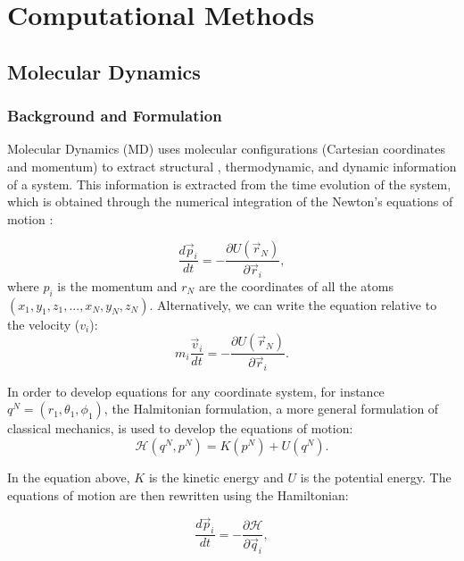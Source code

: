 
\chapter{Computational Methods} %

\label{Chapter3} %

\section{Molecular Dynamics}

\subsection{Background and Formulation}
Molecular Dynamics (MD) uses molecular configurations (Cartesian coordinates and momentum) to extract structural , thermodynamic, and dynamic information of a system. This information is extracted from the time evolution of the system, which is obtained  through the numerical integration of the Newton's equations of motion \cite{tuckerman}:

\begin{equation}
\frac{d \vec{p}_{i}}{dt} = - \frac{\partial U (\vec{r}_{N})}{\partial \vec{r}_{i}},
\end{equation}
where $p_{i}$ is the momentum and $r_{N}$ are the coordinates of all the atoms $(x_{1},y_{1},z_{1},...,x_{N},y_{N},z_{N})$. Alternatively, we can write the equation relative to the velocity ($v_{i}$):
\begin{equation}
m_{i} \frac{\vec{v}_{i}}{dt} = - \frac{\partial U (\vec{r}_{N})}{\partial \vec{r}_{i}}.
\end{equation}

In order to develop equations for any coordinate system, for instance $q^{N}=(r_{1},\theta _{1},\phi _{1})$, the Halmitonian formulation, a more general formulation of classical mechanics,  is used to develop the equations of motion:
\begin{equation}
\mathcal{H} (q^{N},p^{N}) = K(p^{N}) + U(q^{N}) .
\end{equation}

In the equation above, $K$ is the kinetic energy and $U$ is the potential energy. The equations of motion are then rewritten using the Hamiltonian:

\begin{equation}
\frac{d \vec{p}_{i}}{dt} = - \frac{\partial \mathcal{H}}{\partial \vec{q}_{i}},
\end{equation}

